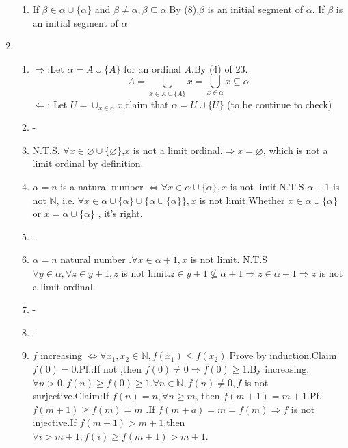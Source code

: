 \documentclass[12pt]{article}
\newcommand{\NN}{\mathbb{N}}
\begin{document}
\begin{enumerate}
\begin{enumerate}
            \item If $\beta\in \alpha\cup\{\alpha\}$ and $\beta\not=\alpha,\beta \subseteq\alpha$.By (8),$\beta$ is an initial segment of $\alpha$. If $\beta$ is an initial segment of $\alpha$    
        \end{enumerate}
    \item 
        \begin{enumerate}
            \item $\Rightarrow$:Let $\alpha=A\cup\{A\}$ for an ordinal $A$.By (4) of 23. $$A=\bigcup_{x\in A\cup\{A\}}x=\bigcup_{x\in \alpha}x\subseteq \alpha$$
            $\Leftarrow $: Let $U=\cup_{x\in \alpha}x$,claim that $\alpha=U\cup\{U\}$ (to be continue to check)
            \item -
            \item N.T.S. $\forall x\in \varnothing\cup\{\varnothing\}$,$x$ is not a limit ordinal.$\Rightarrow x=\varnothing$, which is not a limit ordinal by definition.
            \item $\alpha=n$ is a natural number $\Leftrightarrow \forall x\in \alpha\cup\{\alpha\},x$ is not limit.N.T.S $\alpha+1$ is not $\NN$, i.e. $\forall x\in \alpha\cup \{\alpha\}\cup\{\alpha\cup\{\alpha\}\},x$ is not limit.Whether $x\in \alpha\cup\{\alpha\}$ or $x=\alpha\cup\{\alpha\}$ , it's right.
            \item -
            \item $\alpha=n$ natural number .$\forall x\in \alpha+1,x$ is not limit. N.T.S $\forall y\in \alpha,\forall z\in y+1 ,z$ is not limit.$z\in y+1\nsubseteq \alpha+1\Rightarrow z\in \alpha+1\Rightarrow z $ is not a limit ordinal.
            \item -
            \item -
            \item  $f$ increasing $\Leftrightarrow \forall x_1,x_2\in \NN,f(x_1)\le f(x_2)$.Prove by induction.Claim $f(0)=0$.Pf.:If not ,then $f(0)\not=0\Rightarrow f(0)\ge 1$.By increasing,$\forall n>0,f(n)\ge f(0)\ge 1.\forall n\in \NN ,f(n)\not=0,f$ is not surjective.Claim:If $f(n)=n,\forall n\ge m $, then $f(m+1)=m+1$.Pf. $f(m+1)\ge f(m)=m$ .If $f(m+a)=m=f(m)\Rightarrow f $ is not injective.If $f(m+1)>m+1$,then $\forall i >m+1,f(i)\ge f(m+1)>m+1$.     
       \end{enumerate}
\end{enumerate}
\end{document}
